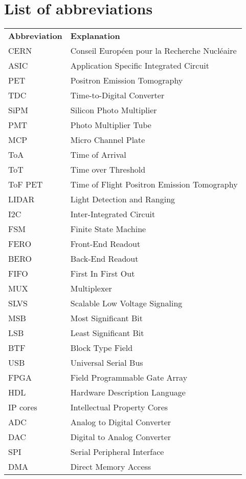 \documentclass[twoside]{ctuthesis}
\theoremstyle{plain}
\theoremstyle{definition}
\theoremstyle{note}
\begin{document}
\clearpage
\FloatBarrier
\printbibliography

\chapter*{List of abbreviations}
\noindent
\begin{tabularx}{\linewidth}
{ l >{\raggedright\arraybackslash}X }
\bfseries Abbreviation & \bfseries Explanation\\\Midrule
CERN & Conseil Européen pour la Recherche Nucléaire \\
ASIC & Application Specific Integrated Circuit \\
PET & Positron Emission Tomography\\
TDC & Time-to-Digital Converter\\
SiPM & Silicon Photo Multiplier\\
PMT & Photo Multiplier Tube\\
MCP & Micro Channel Plate\\
ToA & Time of Arrival\\
ToT & Time over Threshold\\
ToF PET & Time of Flight Positron Emission Tomography\\
LIDAR & Light Detection and Ranging\\
I2C & Inter-Integrated Circuit\\
FSM & Finite State Machine\\
FERO & Front-End Readout\\
BERO & Back-End Readout\\
FIFO & First In First Out\\
MUX & Multiplexer\\
SLVS & Scalable Low Voltage Signaling\\
MSB & Most Significant Bit\\
LSB & Least Significant Bit\\
BTF & Block Type Field\\
USB & Universal Serial Bus\\
FPGA & Field Programmable Gate Array\\
HDL & Hardware Description Language\\
IP cores & Intellectual Property Cores\\
ADC & Analog to Digital Converter\\
DAC & Digital to Analog Converter\\
SPI & Serial Peripheral Interface\\
DMA & Direct Memory Access\\

\end{tabularx}
\end{document}

